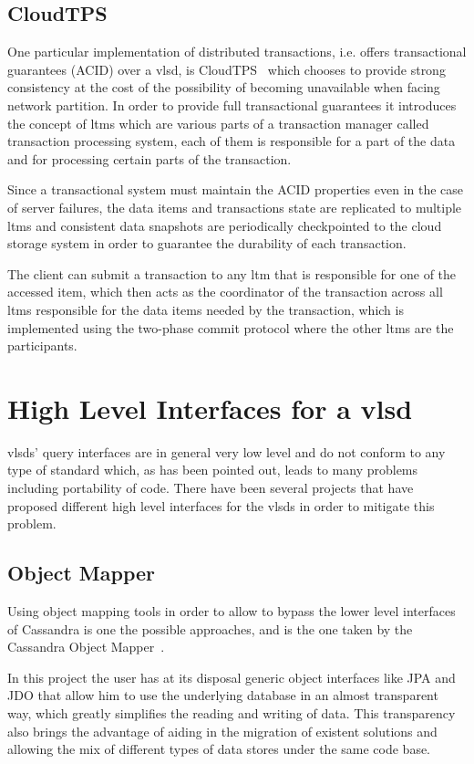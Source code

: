 \subsection{CloudTPS}
One particular implementation of distributed transactions, i.e. offers transactional guarantees (ACID) over a \ac{vlsd}, is CloudTPS~\cite{cloudTPS} which chooses to provide strong consistency at the cost of the possibility of becoming unavailable when facing network partition. In order to provide full transactional guarantees it introduces the concept of \acp{ltm} which are various parts of a transaction manager called transaction processing system, each of them is responsible for a part of the data and for processing certain parts of the transaction.

Since a transactional system must maintain the ACID properties even in the case of server failures, the data items and transactions state are replicated to multiple \acp{ltm} and consistent data snapshots are periodically checkpointed to the cloud storage system in order to guarantee the durability of each transaction.

The client can submit a transaction to any \ac{ltm} that is responsible for one of the accessed item, which then acts as the coordinator of the transaction across all \acp{ltm} responsible for the data items needed by the transaction, which is implemented using the two-phase commit protocol where the other \acp{ltm} are the participants.


\section{High Level Interfaces for a \ac{vlsd}}
\acp{vlsd}' query interfaces are in general very low level and do not conform to any type of standard which, as has been pointed out, leads to many problems including portability of code. There have been several projects that have proposed different high level interfaces for the \acp{vlsd} in order to mitigate this problem. 

\subsection{Object Mapper}

Using object mapping tools in order to allow to bypass the lower level interfaces of Cassandra is one the possible approaches, and is the one taken by the Cassandra Object Mapper~\cite{Pi}. 

In this project the user has at its disposal generic object interfaces like JPA and JDO that allow him to use the underlying database in an almost transparent way, which greatly simplifies the reading and writing of data. This transparency also brings the advantage of aiding in the migration of existent solutions and allowing the mix of different types of data stores under the same code base.  

